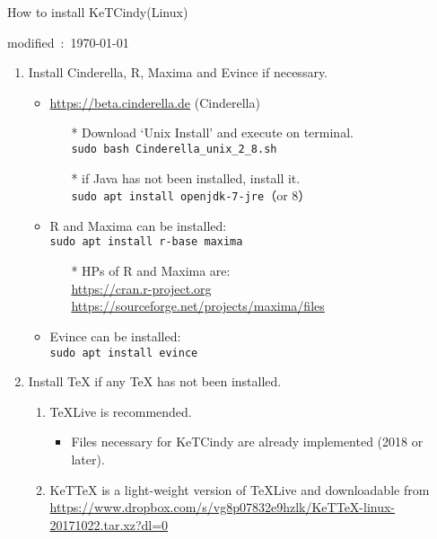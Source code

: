 \documentclass{article}
\begin{document}
\begin{center}
How to install KeTCindy(Linux)
\end{center}

\hfill modified\ :\ \today

\begin{enumerate}[\bf\large 1.]

\item Install Cinderella, R, Maxima and Evince if necessary.
    \begin{itemize}
    \item \url{https://beta.cinderella.de}  (Cinderella)
      \begin{itemize}
      \item[*]Download `Unix Install' and execute on terminal.\\
      \hspace*{10mm}\verb|sudo bash Cinderella_unix_2_8.sh|
      \item[*]if Java has not been installed, install it.\\
      \hspace*{10mm}\verb|sudo apt install openjdk-7-jre|（or 8）
      \end{itemize}
   \item R and Maxima can be installed:\\
   \hspace*{10mm}\verb|sudo apt install r-base maxima|
    \begin{itemize}
    \item[*]HPs of R and Maxima are:\\
    \hspace*{10mm}\url{https://cran.r-project.org}\\
    \hspace*{10mm}\url{https://sourceforge.net/projects/maxima/files}
    \end{itemize}
   \item Evince can be installed:\\
   \hspace*{10mm}\verb|sudo apt install evince|
    \end{itemize}

\item Install TeX if any TeX has not been installed.
  \begin{enumerate}[(1)]
  \item TeXLive is recommended.
    \begin{itemize}
    \item Files necessary for KeTCindy are already implemented (2018 or later).
    \end{itemize}
  \item KeTTeX is a light-weight version of TeXLive and downloadable from\\
  \hspace*{6mm}\url{https://www.dropbox.com/s/vg8p07832e9hzlk/KeTTeX-linux-20171022.tar.xz?dl=0}
 \end{enumerate}


\end{enumerate}
\end{document}
